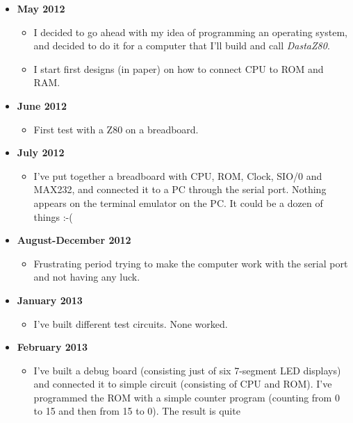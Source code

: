 \documentclass[a4paper,11pt]{article}
\begin{document}
    \begin{itemize}
        \item \textbf{May 2012}
        \begin{itemize}
            \item I decided to go ahead with my idea of programming an operating
            system, and decided to do it for a computer that I'll build and call
            \textit{DastaZ80}.
            \item I start first designs (in paper) on how to connect CPU to ROM
            and RAM.
        \end{itemize}
        \item \textbf{June 2012}
        \begin{itemize}
            \item First test with a Z80 on a breadboard.
        \end{itemize}
        \item \textbf{July 2012}
        \begin{itemize}
            \item I've put together a breadboard with CPU, ROM, Clock, SIO/0 and
            MAX232, and connected it to a PC through the serial port. Nothing
            appears on the terminal emulator on the PC. It could be a dozen of
            things :-(
        \end{itemize}
        \item \textbf{August-December 2012}
        \begin{itemize}
            \item Frustrating period trying to make the computer work with the
            serial port and not having any luck.
        \end{itemize}
        \item \textbf{January 2013}
        \begin{itemize}
            \item I've built different test circuits. None worked.
        \end{itemize}
        \item \textbf{February 2013}
        \begin{itemize}
            \item I've built a debug board (consisting just of six 7-segment LED
            displays) and connected it to simple circuit (consisting of CPU and
            ROM). I've programmed the ROM with a simple counter program
            (counting from 0 to 15 and then from 15 to 0). The result is quite

\end{itemize}
\end{itemize}
\end{document}
